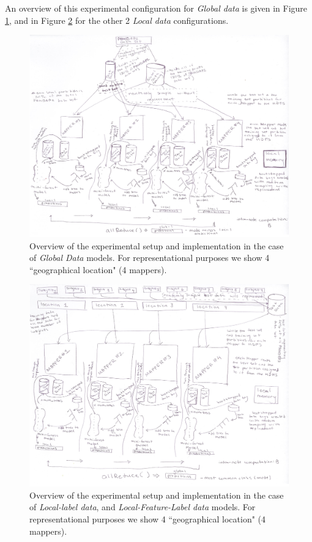 \documentclass{sig-alternate-05-2015}
\begin{document}
An overview of this experimental configuration for \textit{Global data} is given in Figure \ref{fig:globalData}, and in Figure \ref{fig:localData} for the other 2 \textit{Local data} configurations.

\begin{figure}
\includegraphics[scale=0.19,angle=90]{figures/globalData.jpg}
\centering
\caption{Overview of the experimental setup and implementation in the case of \textit{Global Data} models. For  representational purposes we show 4 ``geographical location" (4 mappers).}
\label{fig:globalData}
\end{figure}

\begin{figure}
\includegraphics[scale=0.19,angle=90]{figures/localData.jpg}
\centering
\caption{Overview of the experimental setup and implementation in the case of \textit{Local-label data}, and \textit{Local-Feature-Label data} models. For  representational purposes we show 4 ``geographical location" (4 mappers).}
\label{fig:localData}
\end{figure}
\end{document}
